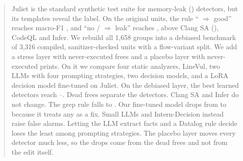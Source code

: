 \begin{abstract}
Juliet is the standard synthetic test suite for memory-leak (\cwe) detectors, but its templates reveal the label.
On the original \cwe{} units, the rule `` $\Rightarrow$ good'' reaches macro-F1 ,
and ``no / $\Rightarrow$ leak'' reaches ,
above Clang SA (), CodeQL and Infer.
We rebuild all 1,658 \cwe{} groups into a debiased benchmark of 3,316 compiled, sanitizer-checked units with a flow-variant split.
We add a stress layer with never-executed frees and a placebo layer with never-executed prints.
On it we compare four static analyzers, LineVul, two LLMs with four prompting strategies, two decision models, and a LoRA decision model fine-tuned on Juliet.
On the debiased layer, the best learned detectors reach --.
Dead frees separate the detectors.
Clang SA and Infer do not change.
The grep rule falls to .
Our fine-tuned model drops from  to  because it treats any  as a fix.
Small LLMs and Intern-Decision instead raise false alarms.
Letting the LLM extract facts and a Datalog rule decide loses the least among prompting strategies.
The placebo layer moves every detector much less, so the drops come from the dead frees and not from the edit itself.
\end{abstract}
